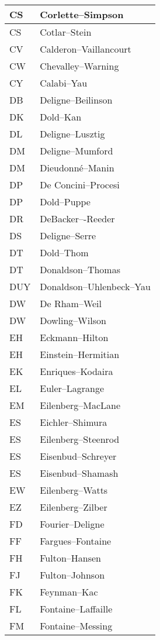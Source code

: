 \documentclass{amsart}
\numberwithin{equation}{section}
\theoremstyle{plain}
\numberwithin{equation}{section}
\theoremstyle{remark}
\begin{document}
\begin{multicols}{2}
{\begin{longtable}{l|l}
CS & Corlette--Simpson\\ \hline
CS & Cotlar--Stein\\ \hline
CV & Calderon--Vaillancourt\\ \hline
CW & Chevalley--Warning\\ \hline
CY & Calabi--Yau\\ \hline
DB & Deligne--Beilinson\\ \hline
DK & Dold--Kan\\ \hline
DL & Deligne--Lusztig\\ \hline
DM & Deligne--Mumford\\ \hline
DM & Dieudonné--Manin\\ \hline
DP & De Concini--Procesi\\ \hline
DP & Dold--Puppe\\ \hline
DR & DeBacker–-Reeder\\ \hline
DS & Deligne--Serre \\ \hline
DT & Dold--Thom\\ \hline
DT & Donaldson--Thomas\\ \hline
DUY & Donaldson--Uhlenbeck--Yau\\ \hline
DW & De Rham--Weil\\ \hline
DW & Dowling--Wilson\\ \hline
EH & Eckmann--Hilton\\ \hline
EH & Einstein--Hermitian\\ \hline
EK & Enriques--Kodaira\\ \hline
EL & Euler--Lagrange\\ \hline
EM & Eilenberg--MacLane\\ \hline
ES & Eichler--Shimura\\ \hline
ES & Eilenberg--Steenrod\\ \hline
ES & Eisenbud--Schreyer\\ \hline
ES & Eisenbud--Shamash\\ \hline
EW & Eilenberg--Watts\\ \hline
EZ & Eilenberg--Zilber\\ \hline
FD & Fourier--Deligne\\ \hline
FF & Fargues--Fontaine\\ \hline
FH & Fulton--Hansen\\ \hline
FJ & Fulton--Johnson\\ \hline
FK & Feynman--Kac\\ \hline
FL & Fontaine--Laffaille\\ \hline
FM &  Fontaine--Messing\\ \hline

\end{longtable}}
\end{multicols}
\end{document}
